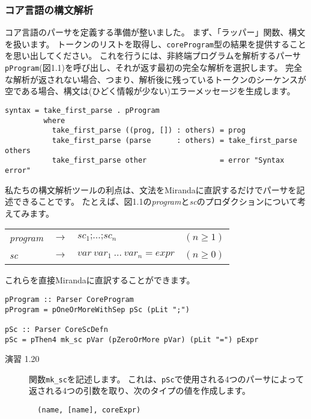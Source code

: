 \documentclass{jarticle}
\begin{document}
\subsubsection{コア言語の構文解析}

コア言語のパーサを定義する準備が整いました。
まず、「ラッパー」関数、構文を扱います。
トークンのリストを取得し、\texttt{coreProgram}型の結果を提供することを思い出してください。
これを行うには、非終端プログラムを解析するパーサ\texttt{pProgram}(図1.1)を呼び出し、それが返す最初の完全な解析を選択します。
完全な解析が返されない場合、つまり、解析後に残っているトークンのシーケンスが空である場合、構文は(ひどく情報が少ない)エラーメッセージを生成します。

\begin{verbatim}
syntax = take_first_parse . pProgram
         where
           take_first_parse ((prog, []) : others) = prog
           take_first_parse (parse      : others) = take_first_parse others
           take_first_parse other                 = error "Syntax error"
\end{verbatim}

私たちの構文解析ツールの利点は、文法をMirandaに直訳するだけでパーサを記述できることです。
たとえば、図1.1の\textit{program}と\textit{sc}のプロダクションについて考えてみます。

\begin{center}
	\begin{tabular} {l c l l}
		\textit{program} & $\rightarrow$ & $sc_1 \texttt{;} \ldots \texttt{;} sc_n$ & $(n \geq 1)$ \\
		\textit{sc}      & $\rightarrow$ & $var ~ var_1 ~ \ldots ~ var_n = expr$    & $(n \geq 0)$
	\end{tabular}
\end{center}

これらを直接Mirandaに直訳することができます。

\begin{verbatim}
pProgram :: Parser CoreProgram
pProgram = pOneOrMoreWithSep pSc (pLit ";")

pSc :: Parser CoreScDefn
pSc = pThen4 mk_sc pVar (pZeroOrMore pVar) (pLit "=") pExpr
\end{verbatim}

\begin{description}
	\item[演習 1.20] 関数\texttt{mk\_sc}を記述します。
	      これは、\texttt{pSc}で使用される4つのパーサによって返される4つの引数を取り、次のタイプの値を作成します。
	      \begin{verbatim}
  (name, [name], coreExpr)
\end{verbatim}
\end{description}
\end{document}
